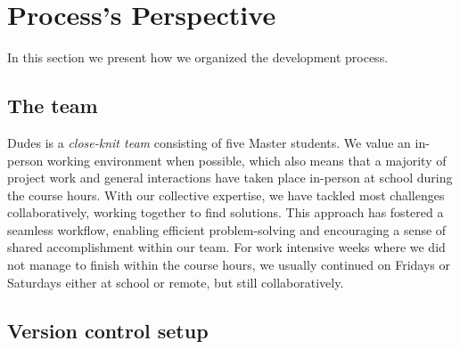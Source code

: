 \section{Process's Perspective} \label{sec:process}
In this section we present how we organized the development process.

\subsection{The team}
Dudes is a \textit{close-knit team} consisting of five Master students. We value an in-person working environment when possible, which also means that a majority of project work and general interactions have taken place in-person at school during the course hours. With our collective expertise, we have tackled most challenges collaboratively, working together to find solutions. This approach has fostered a seamless workflow, enabling efficient problem-solving and encouraging a sense of shared accomplishment within our team. For work intensive weeks where we did not manage to finish within the course hours, we usually continued on Fridays or Saturdays either at school or remote, but still collaboratively.

\subsection{Version control setup}

